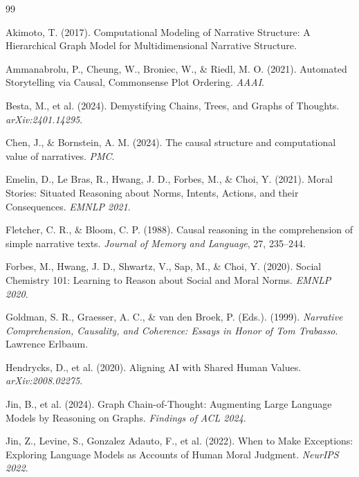 \documentclass[11pt,letterpaper]{article}
\theoremstyle{defn}
\begin{document}
\begin{thebibliography}{99}

Akimoto, T. (2017). Computational Modeling of Narrative Structure: A Hierarchical Graph Model for Multidimensional Narrative Structure.

Ammanabrolu, P., Cheung, W., Broniec, W., \& Riedl, M. O. (2021). Automated Storytelling via Causal, Commonsense Plot Ordering. \textit{AAAI}.

Besta, M., et al. (2024). Demystifying Chains, Trees, and Graphs of Thoughts. \textit{arXiv:2401.14295}.

Chen, J., \& Bornstein, A. M. (2024). The causal structure and computational value of narratives. \textit{PMC}.

Emelin, D., Le Bras, R., Hwang, J. D., Forbes, M., \& Choi, Y. (2021). Moral Stories: Situated Reasoning about Norms, Intents, Actions, and their Consequences. \textit{EMNLP 2021}.

Fletcher, C. R., \& Bloom, C. P. (1988). Causal reasoning in the comprehension of simple narrative texts. \textit{Journal of Memory and Language}, 27, 235--244.

Forbes, M., Hwang, J. D., Shwartz, V., Sap, M., \& Choi, Y. (2020). Social Chemistry 101: Learning to Reason about Social and Moral Norms. \textit{EMNLP 2020}.

Goldman, S. R., Graesser, A. C., \& van den Broek, P. (Eds.). (1999). \textit{Narrative Comprehension, Causality, and Coherence: Essays in Honor of Tom Trabasso}. Lawrence Erlbaum.

Hendrycks, D., et al. (2020). Aligning AI with Shared Human Values. \textit{arXiv:2008.02275}.

Jin, B., et al. (2024). Graph Chain-of-Thought: Augmenting Large Language Models by Reasoning on Graphs. \textit{Findings of ACL 2024}.

Jin, Z., Levine, S., Gonzalez Adauto, F., et al. (2022). When to Make Exceptions: Exploring Language Models as Accounts of Human Moral Judgment. \textit{NeurIPS 2022}.


\end{thebibliography}
\end{document}
